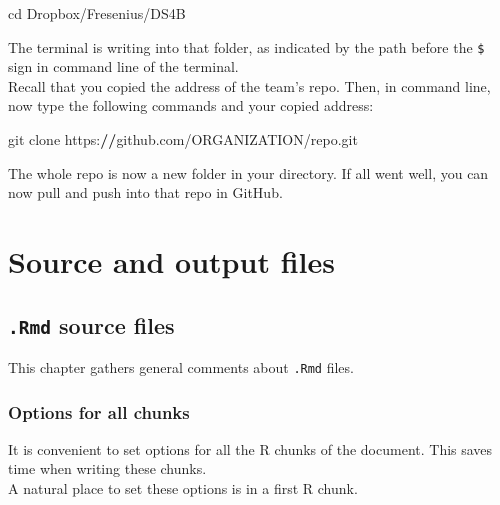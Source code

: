 \documentclass[]{book}
\newenvironment{Shaded}{}{}
\newcommand{\DataTypeTok}[1]{\textcolor[rgb]{0.56,0.13,0.00}{#1}}
\newcommand{\ErrorTok}[1]{\textcolor[rgb]{1.00,0.00,0.00}{\textbf{#1}}}
\newcommand{\KeywordTok}[1]{\textcolor[rgb]{0.00,0.44,0.13}{\textbf{#1}}}
\newcommand{\NormalTok}[1]{#1}
\newcommand{\OperatorTok}[1]{\textcolor[rgb]{0.40,0.40,0.40}{#1}}
\newcommand{\OtherTok}[1]{\textcolor[rgb]{0.00,0.44,0.13}{#1}}
\theoremstyle{definition}
\theoremstyle{definition}
\theoremstyle{definition}
\theoremstyle{remark}
\begin{document}
\begin{Shaded}
\begin{Highlighting}[]
\NormalTok{cd Dropbox}\OperatorTok{/}\NormalTok{Fresenius}\OperatorTok{/}\NormalTok{DS4B }
\end{Highlighting}
\end{Shaded}

The terminal is writing into that folder, as indicated by the path
before the \texttt{\$} sign in command line of the terminal.\\
Recall that you copied the address of the team's repo. Then, in command
line, now type the following commands and your copied address:

\begin{Shaded}
\begin{Highlighting}[]
\NormalTok{git clone https}\OperatorTok{:}\ErrorTok{//}\NormalTok{github.com}\OperatorTok{/}\NormalTok{ORGANIZATION}\OperatorTok{/}\NormalTok{repo.git }
\end{Highlighting}
\end{Shaded}

The whole repo is now a new folder in your directory. If all went well,
you can now pull and push into that repo in GitHub.

\hypertarget{part-source-and-output-files}{%
\part{Source and output
files}\label{part-source-and-output-files}}

\hypertarget{rmd}{%
\chapter{\texorpdfstring{\texttt{.Rmd} source
files}{.Rmd source files}}\label{rmd}}

This chapter gathers general comments about \texttt{.Rmd} files.

\hypertarget{options-for-all-chunks}{%
\section{Options for all chunks}\label{options-for-all-chunks}}

It is convenient to set options for all the R chunks of the document.
This saves time when writing these chunks.\\
A natural place to set these options is in a first R chunk.

\begin{Shaded}
\end{Shaded}
\end{document}
